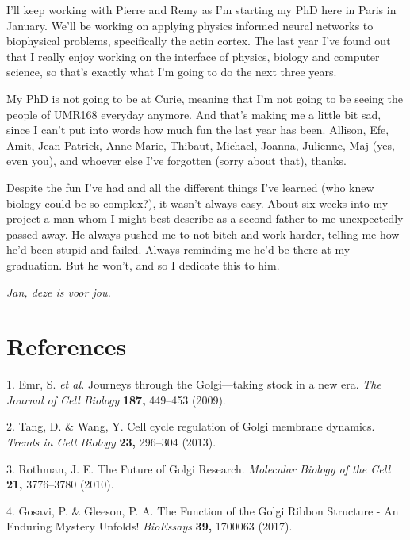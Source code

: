 \documentclass{Dissertate}
\begin{document}
I'll keep working with Pierre and Remy as I'm starting my PhD here in Paris in January. We'll be working on applying physics informed neural networks to biophysical problems, specifically the actin cortex. The last year I've found out that I really enjoy working on the interface of physics, biology and computer science, so that's exactly what I'm going to do the next three years. 

My PhD is not going to be at Curie, meaning that I'm not going to be seeing the people of UMR168 everyday anymore. And that's making me a little bit sad, since I can't put into words how much fun the last year has been. Allison, Efe, Amit, Jean-Patrick, Anne-Marie, Thibaut, Michael, Joanna, Julienne, Maj (yes, even you), and whoever else I've forgotten (sorry about that), thanks. 

Despite the fun I've had and all the different things I've learned (who knew biology could be so complex?), it wasn't always easy. About six weeks into my project a man whom I might best describe as a second father to me unexpectedly passed away. He always pushed me to not bitch and work harder, telling me how he'd been stupid and failed. Always reminding me he'd be there at my graduation. But he won't, and so I dedicate this to him. 

\emph{Jan, deze is voor jou.}


\footnotesize

\hypertarget{references}{%
\chapter*{References}\label{references}}

\hypertarget{refs}{}
\leavevmode\hypertarget{ref-emr_journeys_2009}{}%
1. Emr, S. \emph{et al.} Journeys through the Golgi---taking stock in a
new era. \emph{The Journal of Cell Biology} \textbf{187,} 449--453
(2009).

\leavevmode\hypertarget{ref-tang_cell_2013}{}%
2. Tang, D. \& Wang, Y. Cell cycle regulation of Golgi membrane
dynamics. \emph{Trends in Cell Biology} \textbf{23,} 296--304 (2013).

\leavevmode\hypertarget{ref-rothman_future_2010}{}%
3. Rothman, J. E. The Future of Golgi Research. \emph{Molecular Biology
of the Cell} \textbf{21,} 3776--3780 (2010).

\leavevmode\hypertarget{ref-gosavi_function_2017}{}%
4. Gosavi, P. \& Gleeson, P. A. The Function of the Golgi Ribbon
Structure - An Enduring Mystery Unfolds! \emph{BioEssays} \textbf{39,}
1700063 (2017).
\end{document}

